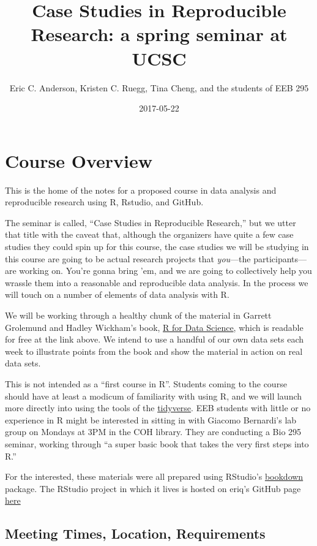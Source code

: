 \documentclass[]{book}
\title{Case Studies in Reproducible Research: a spring seminar at UCSC}
\author{Eric C. Anderson, Kristen C. Ruegg, Tina Cheng, and the students of EEB
295}
\date{2017-05-22}
\theoremstyle{definition}
\theoremstyle{definition}
\theoremstyle{remark}
\begin{document}
\maketitle

{
\setcounter{tocdepth}{1}
\tableofcontents
}
\chapter{Course Overview}\label{course-overview}

This is the home of the notes for a proposed course in data analysis and
reproducible research using R, Rstudio, and GitHub.

The seminar is called, ``Case Studies in Reproducible Research,'' but we
utter that title with the caveat that, although the organizers have
quite a few case studies they could spin up for this course, the case
studies we will be studying in this course are going to be actual
research projects that \emph{you}---the participants---are working on.
You're gonna bring 'em, and we are going to collectively help you
wrassle them into a reasonable and reproducible data analysis. In the
process we will touch on a number of elements of data analysis with R.

We will be working through a healthy chunk of the material in Garrett
Grolemund and Hadley Wickham's book, \href{http://r4ds.had.co.nz/}{R for
Data Science}, which is readable for free at the link above. We intend
to use a handful of our own data sets each week to illustrate points
from the book and show the material in action on real data sets.

This is not intended as a ``first course in R''. Students coming to the
course should have at least a modicum of familiarity with using R, and
we will launch more directly into using the tools of the
\href{http://tidyverse.org/}{tidyverse}. EEB students with little or no
experience in R might be interested in sitting in with Giacomo
Bernardi's lab group on Mondays at 3PM in the COH library. They are
conducting a Bio 295 seminar, working through ``a super basic book that
takes the very first steps into R.''

For the interested, these materials were all prepared using RStudio's
\href{https://bookdown.org/}{bookdown} package. The RStudio project in
which it lives is hosted on eriq's GitHub page
\href{https://github.com/eriqande/rep-res-eeb-2017}{here}

\section{Meeting Times, Location,
Requirements}\label{meeting-times-location-requirements}
\end{document}
